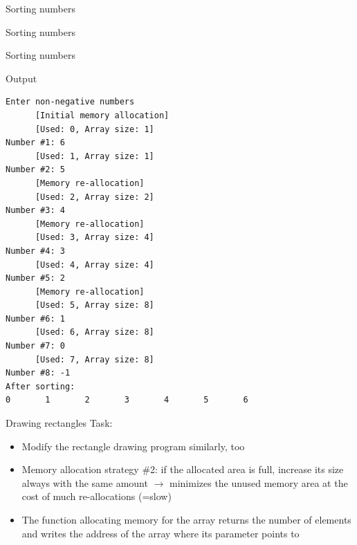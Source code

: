 \documentclass[usenames,dvipsnames,aspectratio=169]{beamer}
\begin{document}
\begin{frame}{Sorting numbers}
  \begin{exampleblock}{}
    
  \end{exampleblock}
\end{frame}

\begin{frame}{Sorting numbers}
  \fontsize{8}{9} \selectfont
  \begin{exampleblock}{}
    \vspace{-.3cm}
    
    \vspace{-.3cm}
  \end{exampleblock}
\end{frame}

\begin{frame}[fragile]{Sorting numbers}
  \fontsize{7}{8} \selectfont
  \begin{block}{Output}
    \begin{verbatim}
Enter non-negative numbers
      [Initial memory allocation]
      [Used: 0, Array size: 1]
Number #1: 6
      [Used: 1, Array size: 1]
Number #2: 5
      [Memory re-allocation]
      [Used: 2, Array size: 2]
Number #3: 4
      [Memory re-allocation]
      [Used: 3, Array size: 4]
Number #4: 3
      [Used: 4, Array size: 4]
Number #5: 2
      [Memory re-allocation]
      [Used: 5, Array size: 8]
Number #6: 1
      [Used: 6, Array size: 8]
Number #7: 0
      [Used: 7, Array size: 8]
Number #8: -1
After sorting:
0       1       2       3       4       5       6
\end{verbatim}
  \end{block}
\end{frame}

\begin{frame}{Drawing rectangles}
  Task:
  \begin{itemize}
    \item Modify the rectangle drawing program similarly, too
    \item Memory allocation strategy \#2: if the allocated area is full, increase its size always with the same amount $\to$ minimizes the unused memory area at the cost of much re-allocations (=slow)
    \item The function allocating memory for the array returns the number of elements and writes the address of the array where its parameter points to
  \end{itemize}
  \begin{exampleblock}{}
    \scriptsize
    \vspace{-.3cm}
    
    \vspace{-.3cm}
  \end{exampleblock}
\end{frame}
\end{document}
